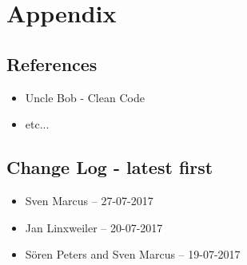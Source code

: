 \chapter{Appendix}

\section{References}
\begin{itemize}
	\item Uncle Bob - Clean Code
	\item etc...
\end{itemize}

\section{Change Log - \small\textnormal {latest first}}
\begin{itemize}
	\item Sven Marcus – 27-07-2017
	\item Jan Linxweiler – 20-07-2017
	\item Sören Peters and Sven Marcus – 19-07-2017
\end{itemize}